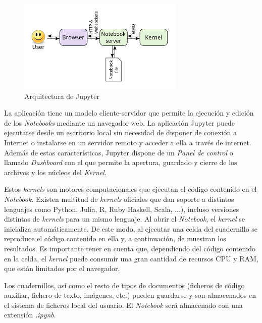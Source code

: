 \begin{figure}[H]
  \begin{center}
    \includegraphics[width=0.9\linewidth]{figures/jupyter.png}
		\caption{Arquitectura de Jupyter}
		\label{fig.jupyter}
		\end{center}
\end{figure}

La aplicación tiene un modelo cliente-servidor que permite la ejecución y edición de los \textit{Notebooks} mediante un navegador web. La aplicación Jupyter puede ejecutarse desde un escritorio local sin necesidad de disponer de conexión a Internet o instalarse en un servidor remoto y acceder a ella a través de internet. Además de estas características, Jupyter dispone de un \textit{Panel de control} o llamado \textit{Dashboard} con el que permite la apertura, guardado y cierre de los archivos y los núcleos del \textit{Kernel}.

Estos \textit{kernels} son motores computacionales que ejecutan el código contenido en el \textit{Notebook}. Existen multitud de \textit{kernels} oficiales que dan soporte a distintos lenguajes como Python, Julia, R, Ruby Haskell, Scala, ...), incluso versiones distintas de \textit{kernels} para un mismo lenguaje. Al abrir el \textit{Notebook}, el \textit{kernel} se inicializa automáticamente. De este modo, al ejecutar una celda del cuadernillo se reproduce el código contenido en ella y, a continuación, de muestran los resultados. Es importante tener en cuenta que, dependiendo del código contenido en la celda, el \textit{kernel} puede consumir una gran cantidad de recursos CPU y RAM, que están limitados por el navegador.

Los cuadernillos, así como el resto de tipos de documentos (ficheros de código auxiliar, fichero de texto, imágenes, etc.) pueden guardarse y son almacenados en el sistema de ficheros local del usuario. El \textit{Notebook} será almacenado con una extensión \textit{.ipynb}.

